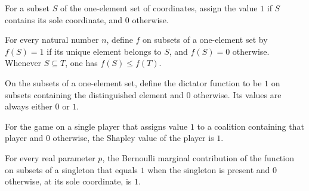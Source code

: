 \begin{definition}
\label{FABL.shapleyDictator}
\leanok
For a subset $S$ of the one-element set of coordinates, assign the value $1$ if $S$
contains its sole coordinate, and $0$ otherwise.
\end{definition}

\begin{theorem}
\label{FABL.shapleyDictator_monotone}
\leanok
{}
For every natural number $n$, define $f$ on subsets of a one-element set by $f(S)=1$ if
its unique element belongs to $S$, and $f(S)=0$ otherwise. Whenever $S\subseteq T$, one
has $f(S)\le f(T)$.
\end{theorem}

\begin{theorem}
\label{FABL.shapleyDictator_zeroOne}
\leanok
{}
On the subsets of a one-element set, define the dictator function to be $1$ on subsets
containing the distinguished element and $0$ otherwise. Its values are always either $0$
or $1$.
\end{theorem}

\begin{theorem}
\label{FABL.shapleyValue_shapleyDictator}
\leanok
{}
For the game on a single player that assigns value $1$ to a coalition containing that
player and $0$ otherwise, the Shapley value of the player is $1$.
\end{theorem}

\begin{theorem}
\label{FABL.bernoulliMarginalContribution_shapleyDictator}
\leanok
{}
For every real parameter $p$, the Bernoulli marginal contribution of the function on
subsets of a singleton that equals $1$ when the singleton is present and $0$ otherwise,
at its sole coordinate, is $1$.
\end{theorem}

